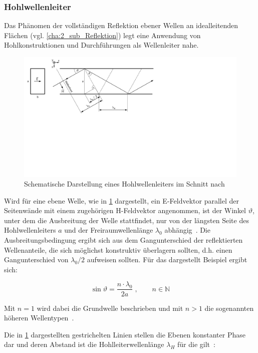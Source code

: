 \subsubsection{Hohlwellenleiter}\label{cha:2_subsub_Hohlwellenleiter}
Das Phänomen der vollständigen Reflektion ebener Wellen an idealleitenden Flächen (vgl. \Abschnitt\ref{cha:2_sub_Reflektion}) legt eine Anwendung von Hohlkonstruktionen und Durchführungen als Wellenleiter nahe. 
\par
\vspace{\linespace}
\begin{figure}
    \centering
    \includegraphics[scale = 1, trim = 0cm 10cm 13cm 0cm, clip, width=.8\textwidth]{Abbildungen/Kapitel2/Hohlwellenleiter.pdf}
    \caption[Schematische Darstellung eines Hohlwellenleiters im Schnitt]{Schematische Darstellung eines Hohlwellenleiters im Schnitt nach~\cite{Taschenbuch_HF-Technik}}
    \label{fig:2_Hohlwellenleiter}
\end{figure}

Wird für eine ebene Welle, wie in \Abb\ref{fig:2_Hohlwellenleiter} dargestellt, ein E-Feldvektor parallel der Seitenwände mit einem zugehörigen H-Feldvektor angenommen, ist der Winkel $\vartheta$, unter dem die Ausbreitung der Welle stattfindet, nur von der längsten Seite des Hohlwellenleiters $a$ und der Freiraumwellenlänge $\lambda_0$ abhängig~\cite{Taschenbuch_HF-Technik}. Die Ausbreitungsbedingung ergibt sich aus dem Gangunterschied der reflektierten Wellenanteile, die sich möglichst konstruktiv überlagern sollten, d.h. einen Gangunterschied von $\lambda_0 / 2$ aufweisen sollten. Für das dargestellt Beispiel ergibt sich: 

\begin{equation}
    \sin{\vartheta} = \frac{n \cdot \lambda_0}{2 a} \; , \qquad n \in \mathbb{N}
\end{equation}
 
Mit $n=1$ wird dabei die Grundwelle beschrieben und mit $n>1$ die sogenannten höheren Wellen\-typen~\cite{Taschenbuch_HF-Technik}.
\par
\vspace{\linespace}
Die in  \Abb\ref{fig:2_Hohlwellenleiter} dargestellten gestrichelten Linien stellen die Ebenen konstanter Phase dar und deren Abstand ist die Hohlleiterwellenlänge $\lambda_H$ für die gilt~\cite{Taschenbuch_HF-Technik}:

